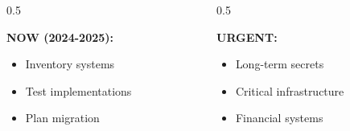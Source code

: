 \documentclass[aspectratio=169,10pt]{beamer}
\newcommand{\teaching}[1]{}
\theoremstyle{plain}
\begin{document}
\begin{frame}
  \vspace{0.5cm}
  
  \begin{columns}
    \begin{column}{0.5\textwidth}
      \begin{blueBox}
        \textbf{NOW (2024-2025):}
        \begin{itemize}
          \item Inventory systems
          \item Test implementations
          \item Plan migration
        \end{itemize}
      \end{blueBox}
    \end{column}
    
    \begin{column}{0.5\textwidth}
      \begin{redBox}
        \textbf{URGENT:}
        \begin{itemize}
          \item Long-term secrets
          \item Critical infrastructure
          \item Financial systems
        \end{itemize}
      \end{redBox}
    \end{column}
  \end{columns}
  
  \teaching{Create urgency for action}
\end{frame}
\end{document}
